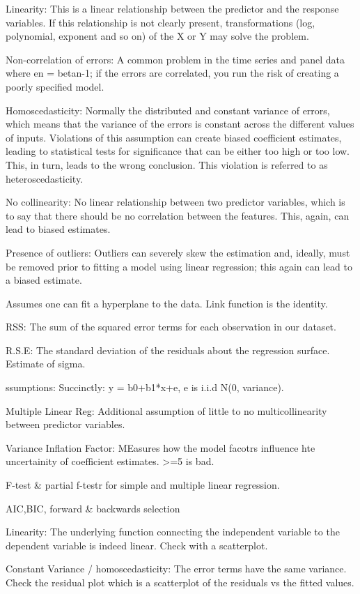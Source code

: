\documentclass[]{book}
\theoremstyle{definition}
\theoremstyle{definition}
\theoremstyle{definition}
\theoremstyle{remark}
\begin{document}
Linearity: This is a linear relationship between the predictor and the
response variables. If this relationship is not clearly present,
transformations (log, polynomial, exponent and so on) of the X or Y may
solve the problem.

Non-correlation of errors: A common problem in the time series and panel
data where en = betan-1; if the errors are correlated, you run the risk
of creating a poorly specified model.

Homoscedasticity: Normally the distributed and constant variance of
errors, which means that the variance of the errors is constant across
the different values of inputs. Violations of this assumption can create
biased coefficient estimates, leading to statistical tests for
significance that can be either too high or too low. This, in turn,
leads to the wrong conclusion. This violation is referred to as
heteroscedasticity.

No collinearity: No linear relationship between two predictor variables,
which is to say that there should be no correlation between the
features. This, again, can lead to biased estimates.

Presence of outliers: Outliers can severely skew the estimation and,
ideally, must be removed prior to fitting a model using linear
regression; this again can lead to a biased estimate.

Assumes one can fit a hyperplane to the data. Link function is the
identity.

RSS: The sum of the squared error terms for each observation in our
dataset.

R.S.E: The standard deviation of the residuals about the regression
surface. Estimate of sigma.

ssumptions: Succinctly: y = b0+b1*x+e, e is i.i.d N(0, variance).

Multiple Linear Reg: Additional assumption of little to no
multicollinearity between predictor variables.

Variance Inflation Factor: MEasures how the model facotrs influence hte
uncertainity of coefficient estimates. \textgreater{}=5 is bad.

F-test \& partial f-testr for simple and multiple linear regression.

AIC,BIC, forward \& backwards selection

Linearity: The underlying function connecting the independent variable
to the dependent variable is indeed linear. Check with a scatterplot.

Constant Variance / homoscedasticity: The error terms have the same
variance. Check the residual plot which is a scatterplot of the
residuals vs the fitted values.
\end{document}
